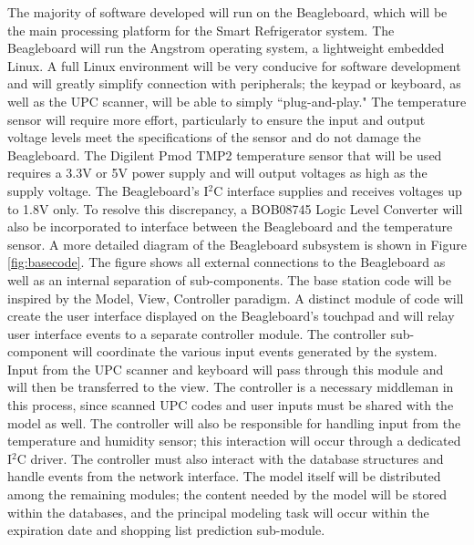 \documentclass[11pt]{article} %
\begin{document}
The majority of software developed will run on the Beagleboard, which will be the main processing platform for the Smart Refrigerator system. The Beagleboard will run the Angstrom operating system, a lightweight embedded Linux. A full Linux environment will be very conducive for software development and will greatly simplify connection with peripherals; the keypad or keyboard, as well as the UPC scanner, will be able to simply ``plug-and-play." The temperature sensor will require more effort, particularly to ensure the input and output voltage levels meet the specifications of the sensor and do not damage the Beagleboard. The Digilent Pmod TMP2 temperature sensor that will be used requires a 3.3V or 5V power supply and will output voltages as high as the supply voltage. The Beagleboard's I$^2$C interface supplies and receives voltages up to 1.8V only. To resolve this discrepancy, a BOB08745 Logic Level Converter will also be incorporated to interface between the Beagleboard and the temperature sensor.
\newline \indent \newline
A more detailed diagram of the Beagleboard subsystem is shown in Figure \ref{fig:basecode}. The figure shows all external connections to the Beagleboard as well as an internal separation of sub-components. The base station code will be inspired by the Model, View, Controller paradigm. A distinct module of code will create the user interface displayed on the Beagleboard's touchpad and will relay user interface events to a separate controller module. The controller sub-component will coordinate the various input events generated by the system. Input from the UPC scanner and keyboard will pass through this module and will then be transferred to the view. The controller is a necessary middleman in this process, since scanned UPC codes and user inputs must be shared with the model as well. The controller will also be responsible for handling input from the temperature and humidity sensor; this interaction will occur through a dedicated I$^2$C driver. The controller must also interact with the database structures and handle events from the network interface. The model itself will be distributed among the remaining modules; the content needed by the model will be stored within the databases, and the principal modeling task will occur within the expiration date and shopping list prediction sub-module.
\end{document}
